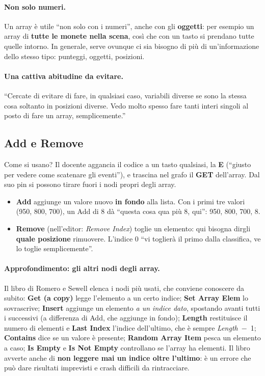 \paragraph{Non solo numeri.} Un array è utile ``non solo con i numeri'', anche
con gli \textbf{oggetti}: per esempio un array di \textbf{tutte le monete nella
scena}, così che con un tasto si prendano tutte quelle intorno. In generale,
serve ovunque ci sia bisogno di più di un'informazione dello stesso tipo:
punteggi, oggetti, posizioni.

\paragraph{Una cattiva abitudine da evitare.} ``Cercate di evitare di fare, in
qualsiasi caso, variabili diverse se sono la stessa cosa soltanto in posizioni
diverse. Vedo molto spesso fare tanti interi singoli al posto di fare un array,
semplicemente.''

\subsection{Add e Remove}

Come si usano? Il docente aggancia il codice a un tasto qualsiasi, la
\textbf{E} (``giusto per vedere come scatenare gli eventi''), e trascina nel
grafo il \textbf{GET} dell'array. Dal suo pin si possono tirare fuori i nodi
propri degli array.
\begin{itemize}
  \item \textbf{Add} aggiunge un valore nuovo \textbf{in fondo} alla lista. Con
        i primi tre valori (950, 800, 700), un Add di 8 dà ``questa cosa qua
        più 8, qui'': 950, 800, 700, 8.
  \item \textbf{Remove} (nell'editor: \emph{Remove Index}) toglie un elemento:
        qui bisogna dirgli \textbf{quale posizione} rimuovere. L'indice 0
        ``vi toglierà il primo dalla classifica, ve lo toglie semplicemente''.
\end{itemize}

\paragraph{Approfondimento: gli altri nodi degli array.} Il libro di Romero e
Sewell elenca i nodi più usati, che conviene conoscere da subito:
\textbf{Get (a copy)} legge l'elemento a un certo indice; \textbf{Set Array
Elem} lo sovrascrive; \textbf{Insert} aggiunge un elemento \emph{a un indice
dato}, spostando avanti tutti i successivi (a differenza di Add, che aggiunge in
fondo); \textbf{Length} restituisce il numero di elementi e \textbf{Last Index}
l'indice dell'ultimo, che è sempre \emph{Length}~$-$~1; \textbf{Contains} dice
se un valore è presente; \textbf{Random Array Item} pesca un elemento a caso;
\textbf{Is Empty} e \textbf{Is Not Empty} controllano se l'array ha elementi. Il
libro avverte anche di \textbf{non leggere mai un indice oltre l'ultimo}: è un
errore che può dare risultati imprevisti e crash difficili da rintracciare.

